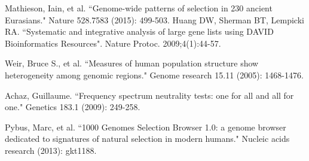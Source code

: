 \documentclass[10pt,letterpaper]{article}
\begin{document}
\begin{thebibliography}{10}
Mathieson, Iain, et al. ``Genome-wide patterns of selection in 230 ancient Eurasians." Nature 528.7583 (2015): 499-503.
\bibitem
Huang DW, Sherman BT, Lempicki RA. ``Systematic and integrative analysis of large gene lists using DAVID Bioinformatics Resources". Nature Protoc. 2009;4(1):44-57.

Weir, Bruce S., et al. ``Measures of human population structure show heterogeneity among genomic regions." Genome research 15.11 (2005): 1468-1476.

Achaz, Guillaume. ``Frequency spectrum neutrality tests: one for all and all for one." Genetics 183.1 (2009): 249-258.

Pybus, Marc, et al. ``1000 Genomes Selection Browser 1.0: a genome browser dedicated to signatures of natural selection in modern humans." Nucleic acids research (2013): gkt1188.


\end{thebibliography}
\end{document}
